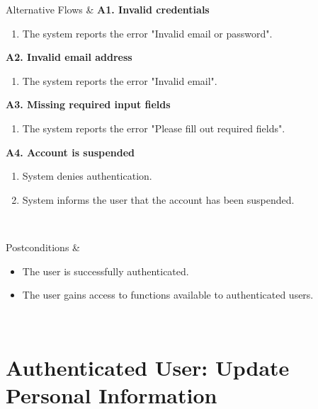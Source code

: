 \begin{usecasespectable}
	Alternative Flows &
	\textbf{A1. Invalid credentials}
	\begin{enumerate}
		\item The system reports the error "Invalid email or password".
	\end{enumerate}

	\textbf{A2. Invalid email address}
	\begin{enumerate}
		\item The system reports the error "Invalid email".
	\end{enumerate}

	\textbf{A3. Missing required input fields}
	\begin{enumerate}
		\item The system reports the error "Please fill out required fields".
	\end{enumerate}

	\textbf{A4. Account is suspended}
	\begin{enumerate}
		\item System denies authentication.
		\item System informs the user that the account has been suspended.
	\end{enumerate}
	\\ \hline

	Postconditions &
	\begin{itemize}
		\item The user is successfully authenticated.
		\item The user gains access to functions available to authenticated users.
	\end{itemize}
	\\ \hline

\end{usecasespectable}

\newpage
\section{Authenticated User: Update Personal Information}


